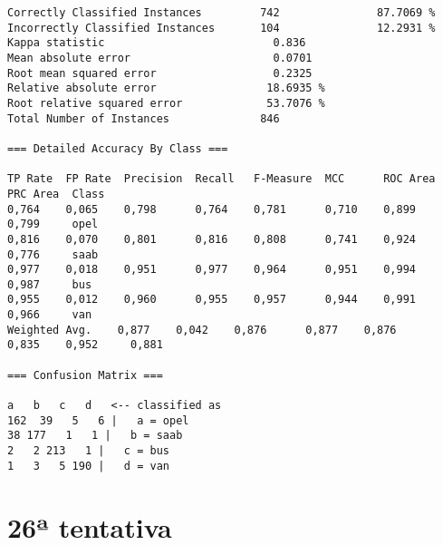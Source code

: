\documentclass[
	article,			%
	11pt,				%
	oneside,			%
	a4paper,			%
	english,			%
	brazil,				%
	sumario=tradicional
	]{abntex2}
\begin{document}
\begin{lstlisting}
Correctly Classified Instances         742               87.7069 %
Incorrectly Classified Instances       104               12.2931 %
Kappa statistic                          0.836 
Mean absolute error                      0.0701
Root mean squared error                  0.2325
Relative absolute error                 18.6935 %
Root relative squared error             53.7076 %
Total Number of Instances              846     

=== Detailed Accuracy By Class ===

TP Rate  FP Rate  Precision  Recall   F-Measure  MCC      ROC Area  PRC Area  Class
0,764    0,065    0,798      0,764    0,781      0,710    0,899     0,799     opel
0,816    0,070    0,801      0,816    0,808      0,741    0,924     0,776     saab
0,977    0,018    0,951      0,977    0,964      0,951    0,994     0,987     bus
0,955    0,012    0,960      0,955    0,957      0,944    0,991     0,966     van
Weighted Avg.    0,877    0,042    0,876      0,877    0,876      0,835    0,952     0,881     

=== Confusion Matrix ===

a   b   c   d   <-- classified as
162  39   5   6 |   a = opel
38 177   1   1 |   b = saab
2   2 213   1 |   c = bus
1   3   5 190 |   d = van

\end{lstlisting}

\section{26ª tentativa}
\end{document}
